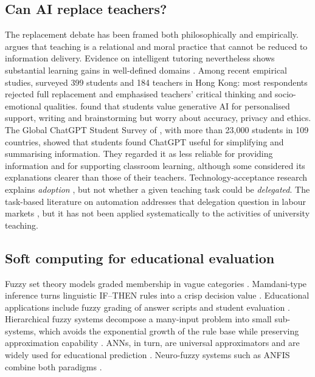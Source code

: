 \documentclass[pdflatex,sn-basic]{sn-jnl}%
\theoremstyle{plain}
\theoremstyle{remark}
\begin{document}
\subsection{Can AI replace teachers?}
The replacement debate has been framed both philosophically and empirically. \citet{selwyn2019} argues that teaching is a relational and moral practice that cannot be reduced to information delivery. Evidence on intelligent tutoring nevertheless shows substantial learning gains in well-defined domains \citep{vanlehn2011,kulik2016}. Among recent empirical studies, \citet{chantsi2024} surveyed 399 students and 184 teachers in Hong Kong: most respondents rejected full replacement and emphasised teachers' critical thinking and socio-emotional qualities. \citet{chanhu2023} found that students value generative AI for personalised support, writing and brainstorming but worry about accuracy, privacy and ethics. The Global ChatGPT Student Survey of \citet{ravselj2025}, with more than 23,000 students in 109 countries, showed that students found ChatGPT useful for simplifying and summarising information. They regarded it as less reliable for providing information and for supporting classroom learning, although some considered its explanations clearer than those of their teachers. Technology-acceptance research explains \emph{adoption} \citep{venkatesh2003}, but not whether a given teaching task could be \emph{delegated}. The task-based literature on automation addresses that delegation question in labour markets \citep{autor2003,frey2017,eloundou2024}, but it has not been applied systematically to the activities of university teaching.

\subsection{Soft computing for educational evaluation}
Fuzzy set theory models graded membership in vague categories \citep{zadeh1965}. Mamdani-type inference turns linguistic IF--THEN rules into a crisp decision value \citep{mamdani1975,ross2010}. Educational applications include fuzzy grading of answer scripts and student evaluation \citep{biswas1995,chenlee1999}. Hierarchical fuzzy systems decompose a many-input problem into small sub-systems, which avoids the exponential growth of the rule base while preserving approximation capability \citep{wang1998}. ANNs, in turn, are universal approximators \citep{hornik1989} and are widely used for educational prediction \citep{romero2020}. Neuro-fuzzy systems such as ANFIS combine both paradigms \citep{jang1993}.
\end{document}
